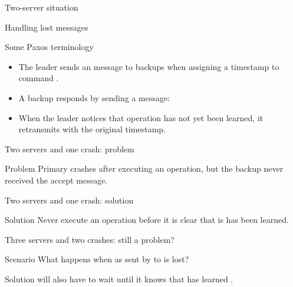 \begin{slide}{Two-server situation}
  \begin{center}
  \end{center}
\end{slide}
\begin{slide}{Handling lost messages}
  \begin{block}{Some Paxos terminology}
    \begin{itemize}
    \item The leader sends an  message  to backups when assigning
      a timestamp  to command .
    \item A backup responds by sending a  message: 
    \item When the leader notices that operation  has not yet been learned, it retransmits
       with the original timestamp.
    \end{itemize}
  \end{block}
\end{slide}
\begin{slide}{Two servers and one crash: problem}
  \centering{}
  \begin{block}{Problem}
    Primary crashes after executing an operation, but the backup never received the accept message.
  \end{block}
\end{slide}
\begin{slide}{Two servers and one crash: solution}
  \centering{}
  \begin{block}{Solution}
    Never execute an operation before it is clear that is has been learned.
  \end{block}
\end{slide}
\begin{slide}{Three servers and two crashes: still a problem?}
  \begin{center}
  \end{center}
  \onslide
  \begin{exampleblock}{Scenario}
    What happens when  as sent by  to  is lost?
  \end{exampleblock}
  \onslide
  \begin{block}{Solution}
     will also have to wait until it knows that  has learned .
  \end{block}
\end{slide}
